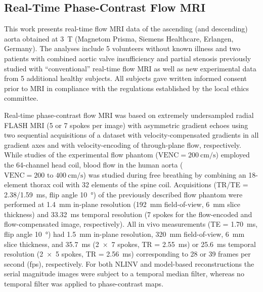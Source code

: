 \subsection{Real-Time Phase-Contrast Flow MRI}
This work presents real-time flow MRI data of the ascending (and descending) aorta obtained at \SI{3}{\tesla} (Magnetom Prisma, Siemens Healthcare, Erlangen, Germany). The analyses include \num{5} volunteers without known illness and two patients with combined aortic valve insufficiency and partial stenosis previously studied with “conventional” real-time flow MRI \cite{2015_PC_Asym} as well as new experimental data from 5 additional healthy subjects. All subjects gave written informed consent prior to MRI in compliance with the regulations established by the local ethics committee. 

Real-time phase-contrast flow MRI was based on extremely undersampled radial FLASH MRI (\num{5} or \num{7} spokes per image) with asymmetric gradient echoes \cite{2015_PC_Asym} using two sequential acquisitions of a dataset with velocity-compensated gradients in all gradient axes and with velocity-encoding of through-plane flow, respectively. While studies of the experimental flow phantom ($\text{VENC} = \SI[per-mode=reciprocal]{200}{\cm\per\second}$) employed the 64-channel head coil, blood flow in the human aorta ($\text{VENC} = 200\text{ to }\SI{400}{\cm\per\second}$) was studied during free breathing by combining an 18-element thorax coil with 32 elements of the spine coil. Acquisitions (TR/TE = \num{2.38}/\SI{1.59}{\ms}, flip angle \SI{10}{\degree}) of the previously described flow phantom \cite{2015_PC_Asym} were performed at \SI{1.4}{\mm} in-plane resolution (\SI{192}{\mm} field-of-view, \SI{6}{\mm} slice thickness) and \SI{33.32}{\ms} temporal resolution (\num{7} spokes for the flow-encoded and flow-compensated image, respectively). All in vivo measurements (TE = \SI{1.70}{\ms}, flip angle \SI{10}{\degree}) had \SI{1.5}{\mm} in-plane resolution, \SI{320}{\mm} field-of-view, \SI{6}{\mm} slice thickness, and \SI{35.7}{\ms} (\num{2 x 7} spokes, TR = \SI{2.55}{\ms}) or \SI{25.6}{\ms} temporal resolution (\num{2 x 5} spokes, TR = \SI{2.56}{\ms}) corresponding to \num{28} or \num{39} frames per second (fps), respectively. For both NLINV and model-based reconstructions the serial magnitude images were subject to a temporal median filter, whereas no temporal filter was applied to phase-contrast maps. 

